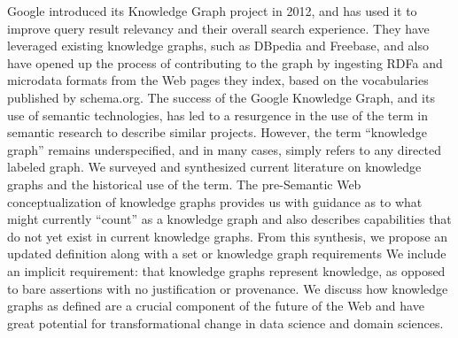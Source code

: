 Google introduced its Knowledge Graph project in 2012, and has used it to improve query result relevancy and their overall search experience.
They have leveraged existing knowledge graphs, such as DBpedia and Freebase, and also have opened up the process of contributing to the graph by ingesting RDFa and microdata formats from the Web pages they index, based on the vocabularies published by schema.org.
The success of the Google Knowledge Graph, and its use of semantic technologies, has led to a resurgence in the use of the term in semantic research to describe similar projects.
However, the term ``knowledge graph'' remains underspecified, and in many cases, simply refers to any directed labeled graph.
We surveyed and synthesized current literature on knowledge graphs and the historical use of the term.  
The pre-Semantic Web conceptualization of knowledge graphs provides us with guidance as to what might currently ``count'' as a knowledge graph and also describes capabilities that do not yet exist in current knowledge graphs.
From this synthesis, we propose an updated definition along with a set or knowledge graph requirements  We include an implicit requirement: that knowledge graphs represent knowledge, as opposed to bare assertions with no justification or provenance.
We discuss how knowledge graphs as defined are a crucial component of the future of the Web and have great potential for transformational change in data science and domain sciences.
